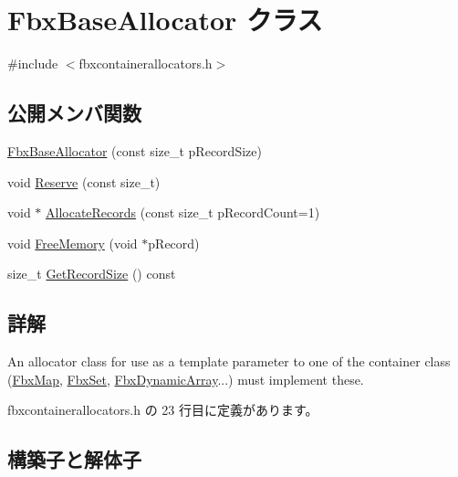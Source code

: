 \hypertarget{class_fbx_base_allocator}{}\section{Fbx\+Base\+Allocator クラス}
\label{class_fbx_base_allocator}


{\ttfamily \#include $<$fbxcontainerallocators.\+h$>$}

\subsection*{公開メンバ関数}
\begin{DoxyCompactItemize}
\item 
\hyperlink{class_fbx_base_allocator_a9597eb137f26dc696170b9eddf0298a5}{Fbx\+Base\+Allocator} (const size\+\_\+t p\+Record\+Size)
\item 
void \hyperlink{class_fbx_base_allocator_ad84870f23a2b067b3bade2604dab2621}{Reserve} (const size\+\_\+t)
\item 
void $\ast$ \hyperlink{class_fbx_base_allocator_a3701773862fa1a808aaff72a3b541d8f}{Allocate\+Records} (const size\+\_\+t p\+Record\+Count=1)
\item 
void \hyperlink{class_fbx_base_allocator_a345b6d46e57e8313966a5f3654d1195c}{Free\+Memory} (void $\ast$p\+Record)
\item 
size\+\_\+t \hyperlink{class_fbx_base_allocator_ab7aa3164aa6fc973baca1515b494198f}{Get\+Record\+Size} () const
\end{DoxyCompactItemize}


\subsection{詳解}
An allocator class for use as a template parameter to one of the container class (\hyperlink{class_fbx_map}{Fbx\+Map}, \hyperlink{class_fbx_set}{Fbx\+Set}, \hyperlink{class_fbx_dynamic_array}{Fbx\+Dynamic\+Array}...) must implement these. 

 fbxcontainerallocators.\+h の 23 行目に定義があります。



\subsection{構築子と解体子}
\mbox{\label{class_fbx_base_allocator_a9597eb137f26dc696170b9eddf0298a5}} 

